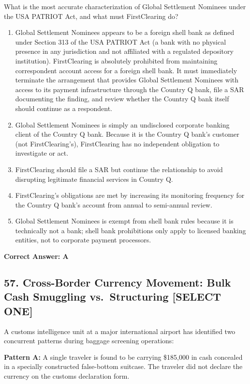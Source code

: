 \documentclass[11pt,a4paper]{article}
\begin{document}
	What is the most accurate characterization of Global Settlement Nominees under the USA PATRIOT Act, and what must FirstClearing do?
	
	\begin{enumerate}[label=\Alph*.]
		\item Global Settlement Nominees appears to be a foreign shell bank as defined under Section 313 of the USA PATRIOT Act (a bank with no physical presence in any jurisdiction and not affiliated with a regulated depository institution). FirstClearing is absolutely prohibited from maintaining correspondent account access for a foreign shell bank. It must immediately terminate the arrangement that provides Global Settlement Nominees with access to its payment infrastructure through the Country Q bank, file a SAR documenting the finding, and review whether the Country Q bank itself should continue as a respondent.
		\item Global Settlement Nominees is simply an undisclosed corporate banking client of the Country Q bank. Because it is the Country Q bank's customer (not FirstClearing's), FirstClearing has no independent obligation to investigate or act.
		\item FirstClearing should file a SAR but continue the relationship to avoid disrupting legitimate financial services in Country Q.
		\item FirstClearing's obligations are met by increasing its monitoring frequency for the Country Q bank's account from annual to semi-annual review.
		\item Global Settlement Nominees is exempt from shell bank rules because it is technically not a bank; shell bank prohibitions only apply to licensed banking entities, not to corporate payment processors.
	\end{enumerate}
	\textbf{Correct Answer: A}
	
	\subsection{57. Cross-Border Currency Movement: Bulk Cash Smuggling vs.\ Structuring \textnormal{[SELECT ONE]}}
	
	A customs intelligence unit at a major international airport has identified two concurrent patterns during baggage screening operations:
	
	\textbf{Pattern A:} A single traveler is found to be carrying \$185,000 in cash concealed in a specially constructed false-bottom suitcase. The traveler did not declare the currency on the customs declaration form.
	
\end{document}
